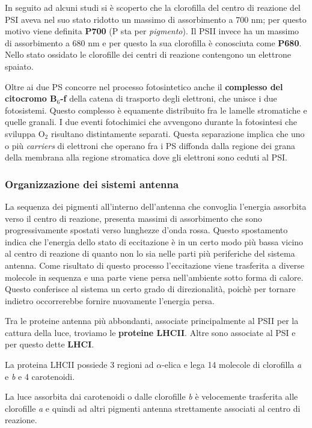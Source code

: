 \documentclass[]{article}
\begin{document}
In seguito ad alcuni studi si è scoperto che la clorofilla del centro di
reazione del PSI aveva nel suo stato ridotto un massimo di assorbimento
a 700 nm; per questo motivo viene definita \textbf{P700} (P sta per
\emph{pigmento}). Il PSII invece ha un massimo di assorbimento a 680 nm
e per questo la sua clorofilla è conosciuta come \textbf{P680}. Nello
stato ossidato le clorofille dei centri di reazione contengono un
elettrone spaiato.

Oltre ai due PS concorre nel processo fotosintetico anche il
\textbf{complesso del citocromo B$_6$-f} della catena di trasporto degli
elettroni, che unisce i due fotosistemi. Questo complesso è equamente
distribuito fra le lamelle stromatiche e quelle granali. I due eventi
fotochimici che avvengono durante la fotosintesi che sviluppa O$_2$
risultano distintamente separati. Questa separazione implica che uno o
più \emph{carriers} di elettroni che operano fra i PS diffonda dalla
regione dei grana della membrana alla regione stromatica dove gli
elettroni sono ceduti al PSI.

\subsubsection{Organizzazione dei sistemi
antenna}\label{organizzazione-dei-sistemi-antenna}

La sequenza dei pigmenti all'interno dell'antenna che convoglia
l'energia assorbita verso il centro di reazione, presenta massimi di
assorbimento che sono progressivamente spostati verso lunghezze d'onda
rossa. Questo spostamento indica che l'energia dello stato di
eccitazione è in un certo modo più bassa vicino al centro di reazione di
quanto non lo sia nelle parti più periferiche del sistema antenna. Come
risultato di questo processo l'eccitazione viene trasferita a diverse
molecole in sequenza e una parte viene persa nell'ambiente sotto forma
di calore. Questo conferisce al sistema un certo grado di direzionalità,
poichè per tornare indietro occorrerebbe fornire nuovamente l'energia
persa.

Tra le proteine antenna più abbondanti, associate principalmente al PSII
per la cattura della luce, troviamo le \textbf{proteine LHCII}. Altre
sono associate al PSI e per questo dette \textbf{LHCI}.

La proteina LHCII possiede 3 regioni ad $\alpha$-elica e lega 14
molecole di clorofilla \emph{a} e \emph{b} e 4 carotenoidi.

La luce assorbita dai carotenoidi o dalle clorofille \emph{b} è
velocemente trasferita alle clorofille \emph{a} e quindi ad altri
pigmenti antenna strettamente associati al centro di reazione.
\end{document}
